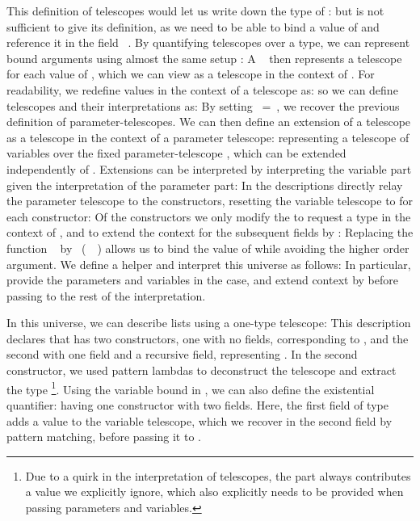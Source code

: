 This definition of telescopes would let us write down the type of :
but is not sufficient to give its definition, as we need to be able to bind a value  of  and reference it in the field \ . By quantifying telescopes over a type, we can represent bound arguments using almost the same setup \cite{practgen}:
A \  then represents a telescope for each value of , which we can view as a telescope in the context of . For readability, we redefine values in the context of a telescope as:
so we can define telescopes and their interpretations as:
By setting \ =\ , we recover the previous definition of parameter-telescopes. We can then define an extension of a telescope as a telescope in the context of a parameter telescope:
representing a telescope of variables over the fixed parameter-telescope , which can be extended independently of . Extensions can be interpreted by interpreting the variable part given the interpretation of the parameter part:
In the descriptions directly relay the parameter telescope to the constructors, resetting the variable telescope to  for each constructor:
Of the constructors we only modify the  to request a type  in the context of , and to extend the context for the subsequent fields by :
Replacing the function \  by \ (\ \ ) allows us to bind the value of  while avoiding the higher order argument. 
We define a helper
and interpret this universe as follows:
In particular, provide  the parameters and variables in the  case, and extend context by  before passing to the rest of the interpretation.

In this universe, we can describe lists using a one-type telescope:
This description declares that  has two constructors, one with no fields, corresponding to \AIC{[]}, and the second with one field and a recursive field, representing . In the second constructor, we used pattern lambdas to deconstruct the telescope and extract the type \footnote{Due to a quirk in the interpretation of telescopes, the  part always contributes a value  we explicitly ignore, which also explicitly needs to be provided when passing parameters and variables.}.
Using the variable bound in , we can also define the existential quantifier:
having one constructor with two fields. Here, the first field of type  adds a value  to the variable telescope, which we recover in the second field by pattern matching, before passing it to .


